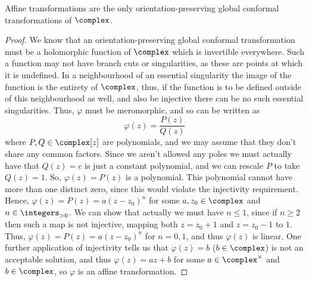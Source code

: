 \documentclass[fleqn]{NotesClass}
\begin{document}
    \begin{lma}{}{}
        Affine transformations are the only orientation-preserving global conformal transformations of \(\complex\).
        \begin{proof}
            We know that an orientation-preserving global conformal transformation must be a holomorphic function of \(\complex\) which is invertible everywhere.
            Such a function may not have branch cuts or singularities, as these are points at which it is undefined.
            In a neighbourhood of an essential singularity the image of the function is the entirety of \(\complex\), thus, if the function is to be defined outside of this neighbourhood as well, and also be injective there can be no such essential singularities.
            Thus, \(\varphi\) must be meromorphic, and so can be written as
            \begin{equation}
                \varphi(z) = \frac{P(z)}{Q(z)}
            \end{equation}
            where \(P, Q \in \complex[z]\) are polynomials, and we may assume that they don't share any common factors.
            Since we aren't allowed any poles we must actually have that \(Q(z) = c\) is just a constant polynomial, and we can rescale \(P\) to take \(Q(z) = 1\).
            So, \(\varphi(z) = P(z)\) is a polynomial.
            This polynomial cannot have more than one distinct zero, since this would violate the injectivity requirement.
            Hence, \(\varphi(z) = P(z) = a(z - z_0)^n\) for some \(a, z_0 \in \complex\) and \(n \in \integers_{>0}\).
            We can show that actually we must have \(n \le 1\), since if \(n \ge 2\) then such a map is not injective, mapping both \(z = z_0 + 1\) and \(z = z_0 - 1\) to \(1\).
            Thus, \(\varphi(z) = P(z) = a(z - z_0)^n\) for \(n = 0, 1\), and thus \(\varphi(z)\) is linear.
            One further application of injectivity tells us that \(\varphi(z) = b\) (\(b \in \complex\)) is not an acceptable solution, and thus \(\varphi(z) = az + b\) for some \(a \in \complex^{\times}\) and \(b \in \complex\), so \(\varphi\) is an affine transformation.
        \end{proof}
    \end{lma}
    
\end{document}
